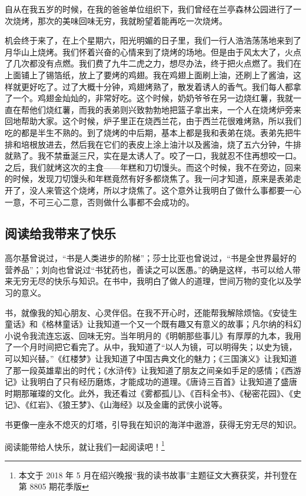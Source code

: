\documentclass[UTF8,a4paper,titlepage,twoside,10.5pt]{article}
\begin{document}
自从在我五岁的时候，在我的爸爸单位组织下，我们曾经在兰亭森林公园进行了一次烧烤，那次的美味回味无穷，我就盼望着能再吃一次烧烤。

机会终于来了，在上个星期六，阳光明媚的日子里，我们一行人浩浩荡荡地来到了月华山上烧烤。我们怀着兴奋的心情来到了烧烤的场地。但是由于风太大了，火点了几次都没有点燃。我们费了九牛二虎之力，想尽办法，终于把火点燃了。我们在上面铺上了锡箔纸，放上了要烤的鸡翅。我在鸡翅上面刷上油，还刷上了酱油，这样就更好吃了。过了大概十分钟，鸡翅烤熟了，散发着诱人的香气。我们每人都拿了一个。鸡翅金灿灿的，非常好吃。这个时候，奶奶爷爷在另一边烧红薯，我就一直在帮他们烧红薯，而我的表弟则兴致勃勃地把篮子拿出来，一个人在烧烤炉旁来回地帮助大家。这个时候，炉子里正在烧西兰花，由于西兰花很难烤熟，所以我们吃的都是半生不熟的。到了烧烤的中后期，基本上都是我和表弟在烧。表弟先把牛排和培根放进去，然后我在它们的表皮上涂上油汁以及酱油，烧了五六分钟，牛排就熟了。我不禁垂涎三尺，实在是太诱人了。咬了一口，我就忍不住再想咬一口。之后，我们就烤这次的主食——年糕和刀切馒头。而这个时候，我不在旁边，回来的时候，发现刀切馒头和年糕竟然有好多都烧焦了。我一问才知道，原来是表弟走开了，没人来管这个烧烤，所以才烧焦了。这个意外让我明白了做什么事都要一心一意，不可三心二意，否则做什么事都不会成功的。

\subsection{阅读给我带来了快乐}
\label{sec:orgc9f1c2d}

高尔基曾说过，“书是人类进步的阶梯”；莎士比亚也曾说过，“书是全世界最好的营养品”；刘向也曾说过“书犹药也，善读之可以医愚。”的确是这样，书可以给人带来无穷无尽的快乐与知识。在书中，我明白了做人的道理，世间万物的变化以及学习的意义。

书，就像我的知心朋友、心灵伴侣。在我不开心时，还能帮我解除烦恼。《安徒生童话》和《格林童话》让我知道一个又一个既有趣又有意义的故事；凡尔纳的科幻小说令我流连忘返、回味无穷。当年明月的《明朝那些事儿》有厚厚的九本，我用了一个月时间把它看完了。从中，我知道了“以人为镜，可以明得失；以史为镜，可以知兴替。”《红楼梦》让我知道了中国古典文化的魅力；《三国演义》让我知道了那一段英雄辈出的时代；《水浒传》让我知道了朋友之间亲如手足的感情；《西游记》让我明白了只有经历磨炼，才能成功的道理。《唐诗三百首》让我知道了盛唐时期那璀璨的文化。此外，我还看过《雾都孤儿》、《百科全书》、《秘密花园》、《史记》、《红岩》、《狼王梦》、《山海经》以及金庸的武侠小说等。

书更像一座永不熄灭的灯塔，引导我在知识的海洋中遨游，获得无穷无尽的知识。

阅读能带给人快乐，就让我们一起阅读吧！\footnote{本文于 2018 年 5 月在绍兴晚报“我的读书故事”主题征文大赛获奖，并刊登在第 8805 期花季版}
\end{document}
